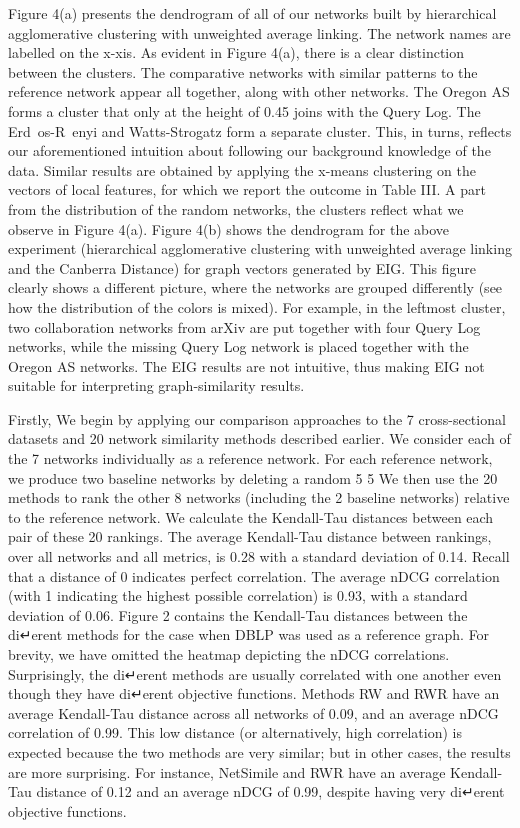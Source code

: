 Figure 4(a) presents the dendrogram of all of our networks built by hierarchical agglomerative clustering with unweighted
average linking. The network names are labelled on the x-xis. As evident in Figure 4(a), there is a
clear distinction between the clusters. The comparative networks with similar patterns to the reference network appear all together, along with other networks. The Oregon AS forms a cluster that only at the height of 0.45 joins with the Query Log. The Erd os-R enyi and Watts-Strogatz form a separate cluster. This, in turns, reflects our aforementioned intuition about following our background knowledge of the data. Similar results are obtained by applying the x-means clustering on the vectors of local features, for which we report the outcome in Table III. A part from the
distribution of the random networks, the clusters reflect what we observe in Figure 4(a).
Figure 4(b) shows the dendrogram for the above experiment (hierarchical agglomerative clustering with unweighted
average linking and the Canberra Distance) for graph vectors
generated by EIG. This figure clearly shows a different
picture, where the networks are grouped differently (see how
the distribution of the colors is mixed). For example, in the
leftmost cluster, two collaboration networks from arXiv are
put together with four Query Log networks, while the missing
Query Log network is placed together with the Oregon AS
networks. The EIG results are not intuitive, thus making EIG
not suitable for interpreting graph-similarity results.


Firstly, 
We
begin by applying our comparison approaches to the 7
cross-sectional datasets and 20 network similarity methods
described earlier. We consider each of the 7 networks
individually as a reference network. For each reference
network, we produce two baseline networks by
deleting a random 5%
5%
We then use the 20 methods to rank the other
8 networks (including the 2 baseline networks) relative
to the reference network. We calculate the Kendall-Tau
distances between each pair of these 20 rankings. The
average Kendall-Tau distance between rankings, over all
networks and all metrics, is 0.28 with a standard deviation
of 0.14. Recall that a distance of 0 indicates perfect
correlation. The average nDCG correlation (with 1 indicating
the highest possible correlation) is 0.93, with
a standard deviation of 0.06. Figure 2 contains the
Kendall-Tau distances between the di↵erent methods
for the case when DBLP was used as a reference graph.
For brevity, we have omitted the heatmap depicting the
nDCG correlations. Surprisingly, the di↵erent methods
are usually correlated with one another even though
they have di↵erent objective functions. Methods RW
and RWR have an average Kendall-Tau distance across
all networks of 0.09, and an average nDCG correlation
of 0.99. This low distance (or alternatively, high correlation)
is expected because the two methods are very similar; but in other cases, the results are more surprising.
For instance, NetSimile and RWR have an average
Kendall-Tau distance of 0.12 and an average nDCG of
0.99, despite having very di↵erent objective functions. 

